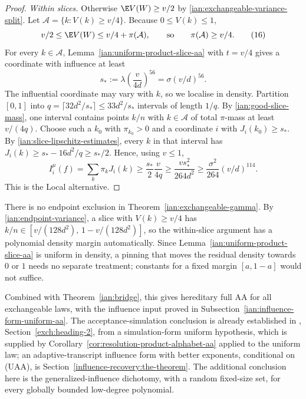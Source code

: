 \begin{proof}
\emph{Within slices.} Otherwise \(\E V(W)\ge v/2\) by
\eqref{ian:exchangeable-variance-split}. Let
\(\mathcal A=\{k:V(k)\ge v/4\}\). Because \(0\le V(k)\le1\),
\[
 v/2\le\E V(W)\le v/4+\pi(\mathcal A),
 \qquad\text{so}\qquad \pi(\mathcal A)\ge v/4.
 \tag{16}\label{ian:good-slice-mass}
\]
For every \(k\in\mathcal A\),
Lemma~\ref{ian:uniform-product-slice-aa} with \(t=v/4\) gives a
coordinate with influence at least
\[
 s_*:=\lambda\left(\frac{v}{4d}\right)^{56}
      =\sigma(v/d)^{56}.
\]
The influential coordinate may vary with \(k\), so we localise in
density. Partition \([0,1]\) into
\(q=\lceil32d^2/s_*\rceil\le33d^2/s_*\) intervals of length \(1/q\).
By \eqref{ian:good-slice-mass}, one interval contains points \(k/n\)
with \(k\in\mathcal A\) of total \(\pi\)-mass at least \(v/(4q)\).
Choose such a \(k_0\) with \(\pi_{k_0}>0\) and a coordinate \(i\) with
\(J_i(k_0)\ge s_*\). By \eqref{ian:slice-lipschitz-estimates}, every
\(k\) in that interval has
\(J_i(k)\ge s_*-16d^2/q\ge s_*/2\). Hence, using \(v\le1\),
\[
 I_i^\mu(f)
 =\sum_k\pi_kJ_i(k)
 \ge\frac{s_*}{2}\frac{v}{4q}
 \ge\frac{vs_*^2}{264d^2}
 \ge\frac{\sigma^2}{264}(v/d)^{114}.
\]
This is the Local alternative.
\end{proof}

\begin{remark}
\label{ian:exchangeable-endpoints}
There is no endpoint exclusion in Theorem~\ref{ian:exchangeable-gamma}.
By \eqref{ian:endpoint-variance}, a slice with \(V(k)\ge v/4\) has
\(k/n\in[v/(128d^2),\,1-v/(128d^2)]\), so the within-slice argument
has a polynomial density margin automatically. Since
Lemma~\ref{ian:uniform-product-slice-aa} is uniform in density, a
pinning that moves the residual density towards \(0\) or \(1\) needs no
separate treatment; constants for a fixed margin \([a,1-a]\) would not
suffice.

Combined with Theorem~\ref{ian:bridge}, this gives hereditary full AA
for all exchangeable laws, with the influence input proved in
Subsection~\ref{ian:influence-form-uniform-aa}. The acceptance-simulation
conclusion is already established in
,
Section~\ref{exch:heading-2}, from a simulation-form uniform
hypothesis, which is supplied by
Corollary~\ref{cor:resolution-product-alphabet-aa} applied to the
uniform law; an adaptive-transcript influence form with better
exponents, conditional on (UAA), is
Section~\ref{influence-recovery:the-theorem}. The
additional conclusion here is the generalized-influence dichotomy, with
a random fixed-size set, for every globally bounded low-degree
polynomial.
\end{remark}
